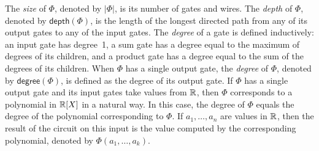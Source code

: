The \textit{size} of $\Phi$, denoted by $|\Phi|$, is its number of gates and wires. The \textit{depth} of $\Phi$, denoted
by $\mathsf{depth}(\Phi)$, is the length of the longest directed path from any of its output gates to any of the input gates. The \textit{degree} of a gate is defined inductively: an input gate has degree~1, a sum gate has a degree equal to the maximum of degrees of its children, and a product gate has a degree equal to the sum of the degrees of its children. When $\Phi$ has a single output gate, the \textit{degree} of $\Phi$, denoted by $\mathsf{degree}(\Phi)$, is defined as the degree of its output gate. If $\Phi$ has a single output gate and its input gates take values from $\mathbb{R}$, then $\Phi$ corresponds to a polynomial in $\mathbb{R}[X]$ in a natural way. In this case, the {degree} of $\Phi$ equals the degree of the polynomial corresponding to $\Phi$.
%
If $a_1,\ldots ,a_n$ are values in $\mathbb{R}$, then 
the result of the circuit on this input is the value computed by the corresponding polynomial, denoted by $\Phi(a_1,\ldots ,a_k)$.


%
%

